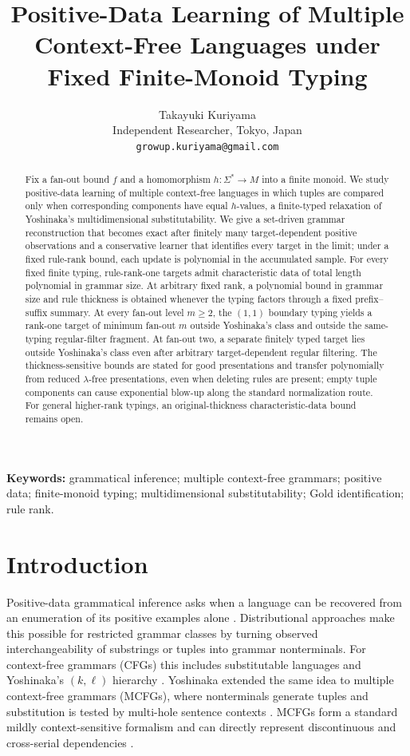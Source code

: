 \documentclass[11pt]{article}
\title{Positive-Data Learning of Multiple Context-Free Languages under Fixed Finite-Monoid Typing}
\author{Takayuki Kuriyama\\
Independent Researcher, Tokyo, Japan\\
\texttt{growup.kuriyama@gmail.com}}
\date{}
\numberwithin{equation}{section}
\theoremstyle{plain}
\theoremstyle{definition}
\theoremstyle{remark}
\begin{document}
\maketitle

\begin{abstract}
Fix a fan-out bound $f$ and a homomorphism $h:\Sigma^*\to M$ into a finite
monoid.  We study positive-data learning of multiple context-free languages in
which tuples are compared only when corresponding components have equal
$h$-values, a finite-typed relaxation of Yoshinaka's multidimensional
substitutability.  We give a set-driven grammar reconstruction that becomes
exact after finitely many target-dependent positive observations and a
conservative learner that identifies every target in the limit; under a fixed
rule-rank bound, each update is polynomial in the accumulated sample.
For every fixed finite typing, rule-rank-one targets admit characteristic data
of total length polynomial in grammar size.  At arbitrary fixed rank, a
polynomial bound in grammar size and rule thickness is obtained whenever the
typing factors through a fixed prefix--suffix summary.  At every fan-out level
$m\ge2$, the $(1,1)$ boundary typing yields a rank-one target of minimum
fan-out $m$ outside Yoshinaka's class and outside the same-typing regular-filter
fragment.  At fan-out two, a separate finitely typed target lies outside
Yoshinaka's class even after arbitrary target-dependent regular filtering.
The thickness-sensitive bounds are stated for good presentations and transfer
polynomially from reduced $\lambda$-free presentations, even when deleting
rules are present; empty tuple components can cause exponential blow-up along
the standard normalization route.  For general higher-rank typings, an
original-thickness characteristic-data bound remains open.
\end{abstract}

\medskip
\noindent\textbf{Keywords:} grammatical inference; multiple context-free grammars; positive data; finite-monoid typing; multidimensional substitutability; Gold identification; rule rank.
\medskip

\section{Introduction}
\label{sec:introduction}

Positive-data grammatical inference asks when a language can be recovered from
an enumeration of its positive examples alone \cite{Gold1967,Angluin1980}.
Distributional approaches make this possible for restricted grammar classes by
turning observed interchangeability of substrings or tuples into grammar
nonterminals.  For context-free grammars (CFGs) this includes substitutable languages
\cite{ClarkEyraud2007} and Yoshinaka's $(k,\ell)$ hierarchy
\cite{Yoshinaka2008}.  Yoshinaka extended the same idea to multiple
context-free grammars (MCFGs), where nonterminals generate tuples and
substitution is tested by multi-hole sentence contexts \cite{Yoshinaka2009,Yoshinaka2011}.
MCFGs form a standard mildly context-sensitive formalism and can directly
represent discontinuous and cross-serial dependencies
\cite{SekiEtAl1991,Kallmeyer2010}.
\end{document}
